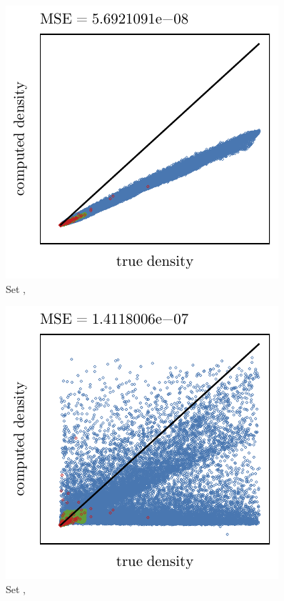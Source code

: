 \begin{subfigure}{0.23\textwidth}
	\centering
	\includegraphics[keepaspectratio=true, width=\textwidth, height=0.23\textheight]{4/img/results_baakman_2_60000_mbe_silverman}
	\caption{Set \baakmanTwo, \mbe}
	\label{fig:4:results:mbe:baakman2}
\end{subfigure}
\begin{subfigure}{0.23\textwidth}
	\centering
	\includegraphics[keepaspectratio=true, width=\textwidth, height=0.23\textheight]{4/img/results_baakman_2_60000_sambe_silverman}
	\caption{Set \baakmanTwo, \sambe}
	\label{fig:4:simulated:datasets:sambe:baakman2}
\end{subfigure}
